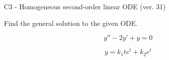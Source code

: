 \begin{exercise}
  \begin{exerciseTitle}C3 - Homogeneous second-order linear ODE (ver. 31)\end{exerciseTitle}
  \begin{exerciseStatement}
    
Find the general solution to the given ODE.

    
\[y''-2y'+y = 0\]

  \end{exerciseStatement}
  \begin{exerciseAnswer}
    
\[y= k_{1} t e^{t} + k_{2} e^{t}\]

  \end{exerciseAnswer}
\end{exercise}